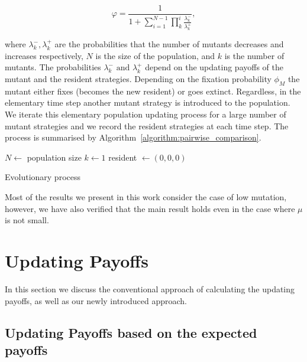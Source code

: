 \documentclass[11pt]{article}
\theoremstyle{plainCl1}
\theoremstyle{plainCl2}
\begin{document}
\begin{equation}\label{eq:appendix_fixation_probability}
    \varphi = \frac{1}{1+\sum\limits_{i=1}^{N-1}\prod\limits_k^i \frac{\lambda^-_k}{\lambda^+_k}},
\end{equation}

where \(\lambda^-_k, \lambda^+_k\) are the probabilities that the number of
mutants decreases and increases respectively, \(N\) is the size of the
population, and \(k\) is the number of mutants. The probabilities \(\lambda^-_k
\text{ and } \lambda^+_k\) depend on the updating payoffs of the mutant and the
resident strategies. Depending on the fixation probability \(\phi_{M}\) the
mutant either fixes (becomes the new resident) or goes extinct. Regardless, in
the elementary time step another mutant strategy is introduced to the
population. We iterate this elementary population updating process for a large
number of mutant strategies and we record the resident strategies at each time
step. The process is summarised by Algorithm~\ref{algorithm:pairwise_comparison}.

\begin{algorithm}[!htbp]
  \SetAlgoLined $N \leftarrow$ population size\; $k \leftarrow 1$\; resident
   $\leftarrow (0, 0, 0)$\;  \caption{Evolutionary
   process}\label{algorithm:pairwise_comparison}
\end{algorithm}

Most of the results we present in this work consider the case of low mutation,
however, we have also verified that the main result holds even in the case where
\(\mu\) is not small. %

\section{Updating Payoffs}\label{section:updating_payoffs}

In this section we discuss the conventional approach of calculating the updating
payoffs, as well as our newly introduced approach.

\subsection{Updating Payoffs based on the expected payoffs}
\end{document}
